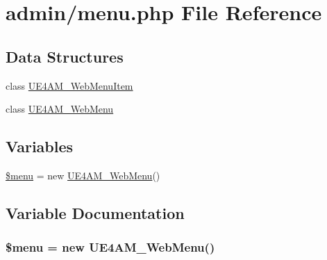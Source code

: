 \hypertarget{menu_8php}{\section{admin/menu.php File Reference}
\label{menu_8php}
}
\subsection*{Data Structures}
\begin{DoxyCompactItemize}
\item 
class \hyperlink{class_u_e4_a_m___web_menu_item}{U\-E4\-A\-M\-\_\-\-Web\-Menu\-Item}
\item 
class \hyperlink{class_u_e4_a_m___web_menu}{U\-E4\-A\-M\-\_\-\-Web\-Menu}
\end{DoxyCompactItemize}
\subsection*{Variables}
\begin{DoxyCompactItemize}
\item 
\hyperlink{menu_8php_a44b0c947ca193a7764153898f5336910}{\$menu} = new \hyperlink{class_u_e4_a_m___web_menu}{U\-E4\-A\-M\-\_\-\-Web\-Menu}()
\end{DoxyCompactItemize}


\subsection{Variable Documentation}
\hypertarget{menu_8php_a44b0c947ca193a7764153898f5336910}{
\subsubsection[{\$menu}]{\setlength{\rightskip}{0pt plus 5cm}\$menu = new {\bf U\-E4\-A\-M\-\_\-\-Web\-Menu}()}}\label{menu_8php_a44b0c947ca193a7764153898f5336910}
